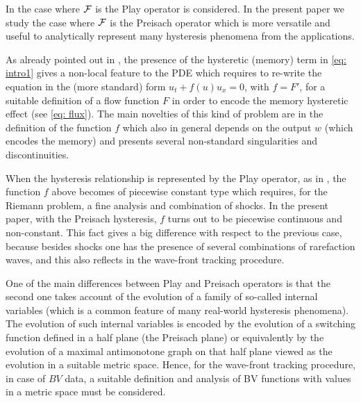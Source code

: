 \documentclass[12pt]{article}
\newcommand{\1}{\mathds{1}}
\theoremstyle{definition}
\begin{document}
In \cite{BFMS} the case where $\cal F$ is the Play operator is considered. In the present paper we study the case where $\cal F$ is the Preisach operator which is more versatile and useful to analytically represent many hysteresis phenomena from the applications.

As already pointed out in \cite{BFMS}, the presence of the hysteretic (memory) term in \eqref{eq: intro1} gives a non-local feature to the PDE which requires to re-write the equation in the (more standard) form $u_t+f(u)u_x=0$, with $f=F'$, for a suitable definition of a flow function $F$ in order to encode the memory hysteretic effect (see \eqref{eq: flux}). The main novelties of this kind of problem are in the definition of the function $f$ which also in general depends on the output $w$ (which encodes the memory) and presents several non-standard singularities and discontinuities. 

When the hysteresis relationship is represented by the Play operator, as in \cite{BFMS}, the function $f$ above becomes of piecewise constant type which requires, for the Riemann problem,  a fine analysis and combination of shocks. In the present paper, with the Preisach hysteresis, $f$ turns out to be piecewise continuous and non-constant. This fact gives a big difference with respect to the previous case, because besides shocks one has the presence of several combinations of rarefaction waves, and this also reflects in the wave-front tracking procedure.

One of the main differences between Play and Preisach operators is that the second one takes account of the evolution of a family of so-called internal variables (which is a common feature of many real-world hysteresis phenomena). The evolution of such internal variables is encoded by the evolution of a switching function defined in a half plane (the Preisach plane) or equivalently by the evolution of a maximal antimonotone graph on that half plane viewed as the evolution in a suitable metric space. Hence, for the wave-front tracking procedure, in case of $BV$ data, a suitable definition and analysis of BV functions with values in a metric space must be considered.
\end{document}
